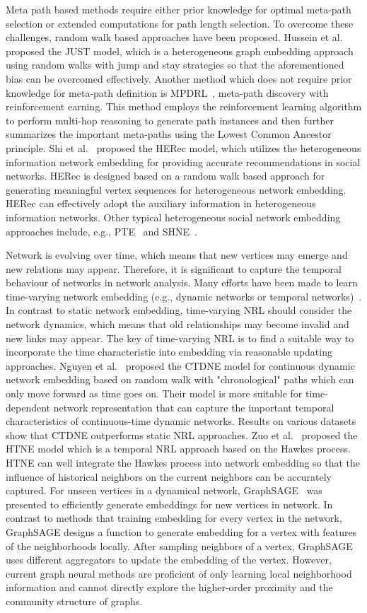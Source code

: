 Meta path based methods require either prior knowledge for optimal meta-path selection or extended computations for path length selection. To overcome these challenges, random walk based approaches have been proposed. Hussein et al.~ proposed the JUST model, which is a heterogeneous graph embedding approach using random walks with jump and stay strategies so that the aforementioned bias can be overcomed effectively. Another method  which does not require prior knowledge for meta-path definition is MPDRL~, meta-path discovery with reinforcement earning. This method employs the reinforcement learning algorithm to perform multi-hop reasoning to generate path instances and then further summarizes the important meta-paths using the Lowest Common Ancestor principle. Shi et al.~ proposed the HERec model, which utilizes the heterogeneous information network embedding for providing accurate recommendations in social networks. HERec is designed based on a random walk based approach for generating meaningful vertex sequences for heterogeneous network embedding. HERec can effectively adopt the auxiliary information in heterogeneous information networks. Other typical heterogeneous social network embedding approaches include, e.g., PTE~ and SHNE~.

Network is evolving over time, which means that new vertices may emerge and new relations may appear. Therefore, it is significant to capture the temporal behaviour of networks in network analysis. Many efforts have been made to learn time-varying network embedding (e.g., dynamic networks or temporal networks)~. In contrast to static network embedding, time-varying NRL should consider the network dynamics, which means that old relationships may become invalid and new links may appear.
The key of time-varying NRL is to find a suitable way to incorporate the time characteristic into embedding via reasonable updating approaches. Nguyen et al.~ proposed the CTDNE model for continuous dynamic network embedding based on random walk with "chronological" paths which can only move forward as time goes on. Their model is more suitable for time-dependent network representation that can capture the important temporal characteristics of continuous-time dynamic networks. Results on various datasets show that CTDNE outperforms static NRL approaches. Zuo et al.~ proposed the HTNE model which is a temporal NRL approach based on the Hawkes process. HTNE can well integrate the Hawkes process into network embedding so that the influence of historical neighbors on the current neighbors can be accurately captured.
For unseen vertices in a dynamical network, GraphSAGE~ was presented to efficiently generate embeddings for new vertices in network. In contrast to methods that training embedding for every vertex in the network, GraphSAGE designs a function to generate embedding for a vertex with features of the neighborhoods locally. After sampling neighbors of a vertex, GraphSAGE uses different aggregators to update the embedding of the vertex. However, current graph neural methods are proficient of only learning local neighborhood information and cannot directly explore the higher-order proximity and the community structure of graphs.

